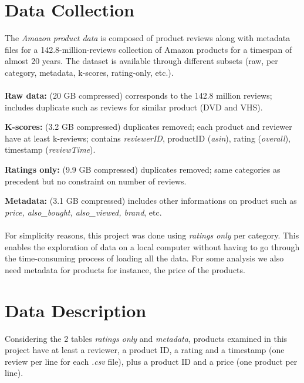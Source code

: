 \documentclass[11pt]{article}
\begin{document}
\section{Data Collection}

The {\em Amazon product data} is composed of product reviews along with metadata files for a 142.8-million-reviews collection of Amazon products for a timespan of almost 20 years. The dataset is available through different subsets (raw, per category, metadata, k-scores, rating-only, etc.).

\paragraph{}
{\bf Raw data:} (20 GB compressed) corresponds to the 142.8 million reviews; includes duplicate such as reviews for similar product (DVD and VHS).

{\bf K-scores:} (3.2 GB compressed) duplicates removed; each product and reviewer have at least k-reviews; contains {\em reviewerID}, productID ({\em asin}), rating ({\em overall}), timestamp ({\em reviewTime}).

{\bf Ratings only:} (9.9 GB compressed) duplicates removed; same categories as precedent but no constraint on number of reviews.

{\bf Metadata:} (3.1 GB compressed) includes other informations on product such as {\em price, also\_bought, also\_viewed, brand}, etc.

\paragraph{}
For simplicity reasons, this project was done using {\em ratings only} per category. This enables the exploration of data on a local computer without having to go through the time-consuming process of loading all the data. For some analysis we also need metadata for products for instance, the price of the products.

\section{Data Description}

Considering the 2 tables {\em ratings only} and {\em metadata}, products examined in this project have at least a reviewer, a product ID, a rating and a timestamp (one review per line for each {\em.csv} file), plus a product ID and a price (one product per line).

\end{document}
